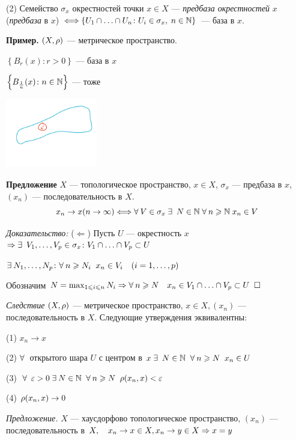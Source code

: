 \documentclass[../../main.tex]{subfiles}
\begin{document}
(2) Семейство $\sigma_x$ окрестностей точки $x \in X$ — \textit{предбаза окрестностей} $x$ (\textit{предбаза} в $x$) $\Longleftrightarrow \left\{ U_1 \cap \ldots \cap U_n \colon U_i \in \sigma_x,\; n \in \mathbb{N} \right\}$ — база в $x$.

\begin{minipage}{0.5\linewidth}
\textbf{Пример.} $\left(X, \rho \right)$ — метрическое пространство.

$\left\{ B_r(x) \colon r > 0 \right\}$ — база в $x$

$\left\{B_{\frac 1 n}(x) \colon n \in \mathbb{N} \right\}$ — тоже

\end{minipage}
\begin{minipage}{0.2\linewidth}
\includegraphics[width=4cm]{pictures/4.jpg}
\end{minipage}

\textbf{Предложение} $X$ — топологическое пространство, $x \in X$, $\sigma_x$ — предбаза в $x$, $(x_n)$ — последовательность в $X$.
$$x_n \to x (n \to \infty) \Longleftrightarrow \forall\: V \in \sigma_x \; \exists\:\; N \in \mathbb{N} \; \forall\: n \geqslant \mathbb{N} \; x_n \in V$$

\textit{Доказательство:} ($\Leftarrow$) Пусть $U$ — окрестность $x$ $\Rightarrow \exists\: \; V_1, \ldots, V_p \in \sigma_x \colon V_1 \cap \ldots \cap V_p \subset U$

$\exists\: N_1, \ldots, N_p \colon \forall\: n \geqslant N_i \;\; x_n \in V_i \quad (i = 1, \ldots, p)$

Обозначим $N = \max_{1 \leqslant i \leqslant n} N_i \Rightarrow \forall\: n \geqslant N \quad x_n \in V_1 \cap \ldots \cap V_p \subset U \;\; \square$

\textit{Следствие} $\left(X, \rho \right)$ — метрическое пространство, $x \in X, (x_n)$ — последовательность в $X$. Следующие утверждения эквивалентны:

(1) $x_n \to x$

(2) $\forall\:$ открытого шара $U$ с центром в $x \; \exists\:\; N \in \mathbb{N}\;\; \forall\: n \geqslant N \;\; x_n \in U$

(3) $\forall\:\; \varepsilon > 0 \; \exists\: N \in \mathbb{N} \;\; \forall\: n \geqslant N \;\; \rho(x_n, x) < \varepsilon$

(4) $\rho(x_n, x) \to 0$

\textit{Предложение.} $X$ — хаусдорфово топологическое пространство, $(x_n)$ — последовательность в $X,\quad x_n \to x \in X, x_n \to y \in X \Rightarrow x = y$
\end{document}
